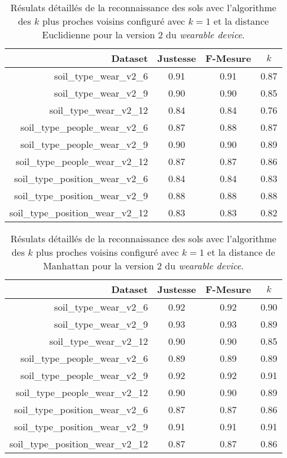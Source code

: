 \begin{table}[H]\renewcommand{\arraystretch}{0.5}
	\centering
	\caption{Résulats détaillés de la reconnaissance des sols avec l'algorithme des $k$ plus proches voisins configuré avec $k=1$ et la distance Euclidienne pour la version 2 du \textit{wearable device}.}
	\label{tab:tab:knn-dE-wear-v2}
	\begin{tabular}{@{}rccc@{}}
		\toprule
			\textbf{Dataset} & \textbf{Justesse} & \textbf{F-Mesure} & \textbf{$k$} \\
		\midrule
			soil\_type\_wear\_v2\_6 & 0.91 & 0.91 & 0.87 \\
			soil\_type\_wear\_v2\_9 & 0.90 & 0.90 & 0.85 \\
			soil\_type\_wear\_v2\_12 & 0.84 & 0.84 & 0.76 \\
			soil\_type\_people\_wear\_v2\_6 & 0.87 & 0.88 & 0.87 \\
			soil\_type\_people\_wear\_v2\_9 & 0.90 & 0.90 & 0.89 \\
			soil\_type\_people\_wear\_v2\_12 & 0.87 & 0.87 & 0.86 \\
			soil\_type\_position\_wear\_v2\_6 & 0.84 & 0.84 & 0.83 \\
			soil\_type\_position\_wear\_v2\_9 & 0.88 & 0.88 & 0.88 \\
			soil\_type\_position\_wear\_v2\_12 & 0.83 & 0.83 & 0.82 \\
		\bottomrule
	\end{tabular}
\end{table}

\begin{table}[H]\renewcommand{\arraystretch}{0.5}
	\centering
	\caption{Résulats détaillés de la reconnaissance des sols avec l'algorithme des $k$ plus proches voisins configuré avec $k=1$ et la distance de Manhattan pour la version 2 du \textit{wearable device}.}
	\label{tab:tab:knn-dM-wear-v2}
	\begin{tabular}{@{}rccc@{}}
		\toprule
			\textbf{Dataset} & \textbf{Justesse} & \textbf{F-Mesure} & \textbf{$k$} \\
		\midrule
			soil\_type\_wear\_v2\_6 & 0.92 & 0.92 & 0.90 \\
			soil\_type\_wear\_v2\_9 & 0.93 & 0.93 & 0.89 \\
			soil\_type\_wear\_v2\_12 & 0.90 & 0.90 & 0.85 \\
			soil\_type\_people\_wear\_v2\_6 & 0.89 & 0.89 & 0.89 \\
			soil\_type\_people\_wear\_v2\_9 & 0.92 & 0.92 & 0.91 \\
			soil\_type\_people\_wear\_v2\_12 & 0.90 & 0.90 & 0.89 \\
			soil\_type\_position\_wear\_v2\_6 & 0.87 & 0.87 & 0.86 \\
			soil\_type\_position\_wear\_v2\_9 & 0.91 & 0.91 & 0.91 \\
			soil\_type\_position\_wear\_v2\_12 & 0.87 & 0.87 & 0.86 \\
		\bottomrule
	\end{tabular}
\end{table}

